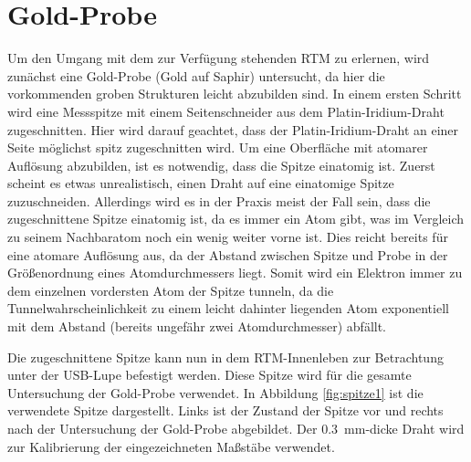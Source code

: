 \section{Gold-Probe}\label{sec:gold}
Um den Umgang mit dem zur Verfügung stehenden RTM zu erlernen, wird zunächst eine Gold-Probe (Gold auf Saphir) untersucht, da hier die vorkommenden groben Strukturen leicht
abzubilden sind. In einem ersten Schritt wird eine Messspitze mit einem Seitenschneider aus dem Platin-Iridium-Draht zugeschnitten. Hier wird darauf geachtet,
dass der Platin-Iridium-Draht an einer Seite möglichst spitz zugeschnitten wird. Um eine Oberfläche mit atomarer Auflösung abzubilden, ist es notwendig, dass
die Spitze einatomig ist. Zuerst scheint es etwas unrealistisch, einen Draht auf eine einatomige Spitze zuzuschneiden. Allerdings wird es in der Praxis
meist der Fall sein, dass die zugeschnittene Spitze einatomig ist, da es immer ein Atom gibt, was im Vergleich zu seinem Nachbaratom noch ein wenig weiter vorne ist.
Dies reicht bereits für eine atomare Auflösung aus, da der Abstand zwischen Spitze und Probe in der Größenordnung eines Atomdurchmessers liegt. Somit wird
ein Elektron immer zu dem einzelnen vordersten Atom der Spitze tunneln, da die Tunnelwahrscheinlichkeit zu einem leicht dahinter liegenden Atom exponentiell
mit dem Abstand (bereits ungefähr zwei Atomdurchmesser) abfällt.\par
Die zugeschnittene Spitze kann nun in dem RTM-Innenleben zur Betrachtung unter der USB-Lupe befestigt werden. Diese Spitze wird für die gesamte Untersuchung
der Gold-Probe verwendet. In Abbildung \ref{fig:spitze1} ist die verwendete Spitze dargestellt. Links ist der Zustand der Spitze vor und rechts nach der Untersuchung
der Gold-Probe abgebildet. Der \SI{0,3}{\milli \meter}-dicke Draht wird zur Kalibrierung der eingezeichneten Maßstäbe verwendet.
